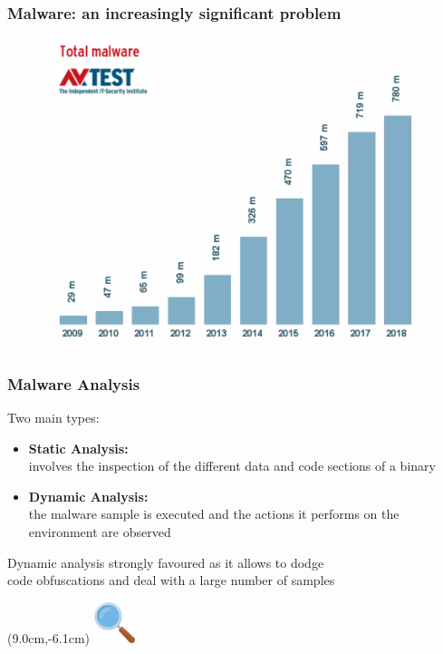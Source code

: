 \documentclass[compress]{beamer}
\begin{document}
\begin{frame}
    \frametitle{Malware: an increasingly significant problem }

    \begin{figure}
        \includegraphics[scale=0.55]{image/malware2}
    \end{figure}
    
\end{frame}

\begin{frame}
    \frametitle{Malware Analysis}

    Two main types:
    \medskip
    \begin{itemize}
        \item \textcolor{sapienza}{\textbf{Static Analysis:}}\\
        involves the inspection of the different data and code sections of a binary
        \item \textcolor{sapienza}{\textbf{Dynamic Analysis:}}\\
        the malware sample is executed and the actions it performs on the environment are observed
    \end{itemize}
    \vspace{0.5cm}    
        
         \begin{beamerboxesrounded}[shadow=true]{}
    Dynamic analysis strongly favoured as it allows to dodge \\ code obfuscations and deal with a large number of samples
    \end{beamerboxesrounded}    

    \begin{textblock*}{2cm}(9.0cm,-6.1cm)
   \includegraphics[width=1.2cm]{image/search.png}%
	\end{textblock*} 

\end{frame}
\end{document}
